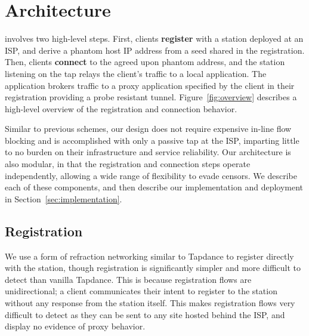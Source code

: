 \documentclass[sigconf,anonymous]{acmart}
\begin{document}


\section{Architecture}
\label{sec:architecture}

\scheme involves two high-level steps. First, clients \textbf{register} with a 
\scheme station deployed at an ISP, and derive a phantom host IP address from 
a seed shared in the registration. Then, clients \textbf{connect} 
to the agreed upon phantom address, and the station listening on the tap 
relays the client's traffic to a local application. The application brokers 
traffic to a proxy application specified by the client in their registration 
providing a probe resistant tunnel. Figure~\ref{fig:overview} describes a 
high-level overview of the \scheme registration and connection behavior.

Similar to previous schemes, our design does not require expensive in-line
flow blocking and is accomplished with only a passive tap at the ISP, imparting
little to no burden on their infrastructure and service reliability.
Our architecture is also modular, in that the registration and connection steps operate
independently, allowing a wide range of flexibility to evade censors. We
describe each of these components, and then describe our implementation and
deployment in Section~\ref{sec:implementation}.

\FigOverview

\subsection{Registration}
\label{sec:registration}
We use a form of refraction networking similar to Tapdance to register directly with
the station, though \scheme registration is significantly simpler and more difficult
to detect than vanilla Tapdance. This is because registration flows are unidirectional; 
a client communicates their intent to register to the station without any 
response from the station itself. This makes registration flows very difficult to detect as they 
can be sent to any site hosted behind the ISP, and display no evidence of proxy behavior. 
\end{document}
